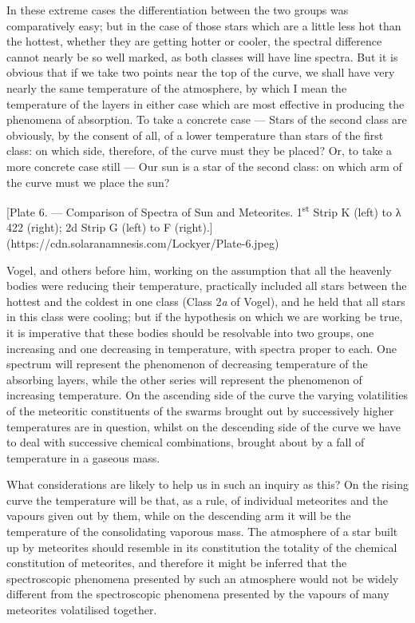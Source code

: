 \documentclass[a4paper, 12pt, oneside, polutonikogreek, english]{article}
\begin{document}
In these extreme cases the differentiation between the two groups was comparatively easy; but in the case of those stars which are a little less hot than the hottest, whether they are getting hotter or cooler, the spectral difference cannot nearly be so well marked, as both classes will have line spectra. But it is obvious that if we take two points near the top of the curve, we shall have very nearly the same temperature of the atmosphere, by which I mean the temperature of the layers in either case which are most effective in producing the phenomena of absorption. To take a concrete case --- Stars of the second class are obviously, by the consent of all, of a lower temperature than stars of the first class: on which side, therefore, of the curve must they be placed? Or, to take a more concrete case still --- Our sun is a star of the second class: on which arm of the curve must we place the sun?

[Plate 6. --- Comparison of Spectra of Sun and Meteorites. 1\textsuperscript{st} Strip K (left) to λ 422 (right); 2d Strip G (left) to F (right).](https://cdn.solaranamnesis.com/Lockyer/Plate-6.jpeg)

Vogel, and others before him, working on the assumption that all the heavenly bodies were reducing their temperature, practically included all stars between the hottest and the coldest in one class (Class 2\emph{a} of Vogel), and he held that all stars in this class were cooling; but if the hypothesis on which we are working be true, it is imperative that these bodies should be resolvable into two groups, one increasing and one decreasing in temperature, with spectra proper to each. One spectrum will represent the phenomenon of decreasing temperature of the absorbing layers, while the other series will represent the phenomenon of increasing temperature. On the ascending side of the curve the varying volatilities of the meteoritic constituents of the swarms brought out by successively higher temperatures are in question, whilst on the descending side of the curve we have to deal with successive chemical combinations, brought about by a fall of temperature in a gaseous mass.

What considerations are likely to help us in such an inquiry as this? On the rising curve the temperature will be that, as a rule, of individual meteorites and the vapours given out by them, while on the descending arm it will be the temperature of the consolidating vaporous mass. The atmosphere of a star built up by meteorites should resemble in its constitution the totality of the chemical constitution of meteorites, and therefore it might be inferred that the spectroscopic phenomena presented by such an atmosphere would not be widely different from the spectroscopic phenomena presented by the vapours of many meteorites volatilised together.
\end{document}
